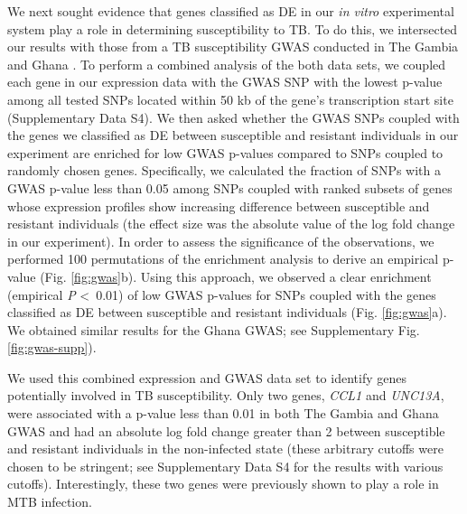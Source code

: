 \documentclass[fleqn,10pt]{wlscirep}
\begin{document}
We next sought evidence that genes classified as DE in our \emph{in
vitro} experimental system play a role in determining susceptibility
to TB. To do this, we intersected our results with those from a TB
susceptibility GWAS conducted in The Gambia and Ghana \cite{Thye2010}.
To perform a combined analysis of the both data sets, we coupled each
gene in our expression data with the GWAS SNP with the lowest p-value
among all tested SNPs located within 50 kb of the gene’s transcription
start site (Supplementary Data S4). We then asked whether the GWAS
SNPs coupled with the genes we classified as DE between susceptible
and resistant individuals in our experiment are enriched for low GWAS
p-values compared to SNPs coupled to randomly chosen genes.
Specifically, we calculated the fraction of SNPs with a GWAS p-value
less than 0.05 among SNPs coupled with ranked subsets of genes whose
expression profiles show increasing difference between susceptible and
resistant individuals (the effect size was the absolute value of the
log fold change in our experiment). In order to assess the
significance of the observations, we performed 100 permutations of the
enrichment analysis to derive an empirical p-value (Fig.
\ref{fig:gwas}b). Using this approach, we observed a clear enrichment
(empirical \emph{P} \textless \, 0.01) of low GWAS p-values for SNPs
coupled with the genes classified as DE between susceptible and
resistant individuals (Fig. \ref{fig:gwas}a). We obtained similar
results for the Ghana GWAS; see Supplementary Fig.
\ref{fig:gwas-supp}).

We used this combined expression and GWAS data set to identify genes
potentially involved in TB susceptibility. Only two genes, \emph{CCL1}
and \emph{UNC13A}, were associated with a p-value less than 0.01 in
both The Gambia and Ghana GWAS and had an absolute log fold change
greater than 2 between susceptible and resistant individuals in the
non-infected state (these arbitrary cutoffs were chosen to be
stringent; see Supplementary Data S4 for the results with various
cutoffs). Interestingly, these two genes were previously shown to play
a role in MTB infection.
\end{document}
